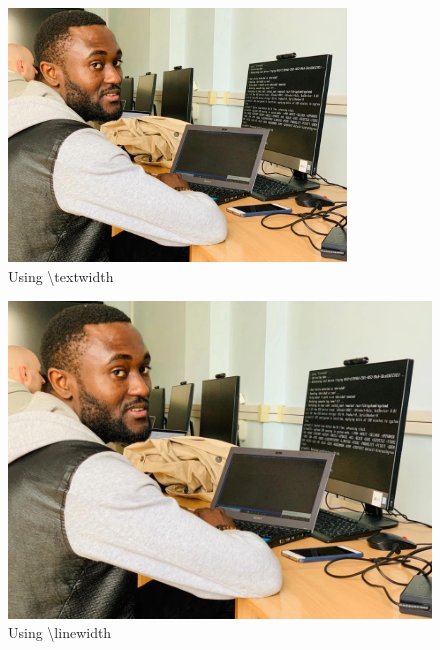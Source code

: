 \documentclass{article}
\begin{document}
\lipsum[1]

\begin{figure}[ht]
    \centering
    \includegraphics[width=0.8\textwidth]{siriki}
    \caption{Using \textbackslash textwidth}
\end{figure}

\begin{figure}[ht]
    \centering
    \includegraphics[width=0.8\linewidth]{siriki}
    \caption{Using \textbackslash linewidth}
\end{figure}

\lipsum[2-5]
\end{document}

